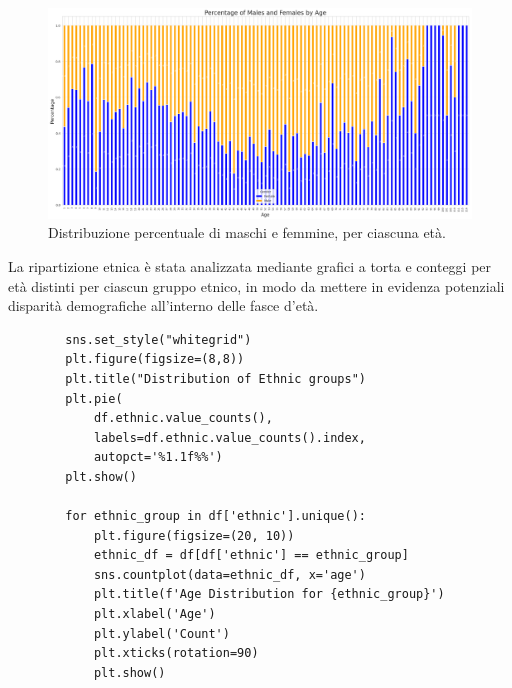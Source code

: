 \documentclass[a4paper,12pt]{report}
\begin{document}
	\begin{figure}[H]
		\centering
		\includegraphics[width=1.0\textwidth]{img/gender_byage_images.png}
		\caption{Distribuzione percentuale di maschi e femmine, per ciascuna età.}
	\end{figure} 
	
	La ripartizione etnica è stata analizzata mediante grafici a torta e conteggi per età distinti per ciascun gruppo etnico, in modo da mettere in evidenza potenziali disparità demografiche all'interno delle fasce d'età. \\
	
	\begin{verbatim}
		sns.set_style("whitegrid")
		plt.figure(figsize=(8,8))
		plt.title("Distribution of Ethnic groups")
		plt.pie(
			df.ethnic.value_counts(), 
			labels=df.ethnic.value_counts().index, 
			autopct='%1.1f%%')
		plt.show()
		
		for ethnic_group in df['ethnic'].unique():
			plt.figure(figsize=(20, 10))
			ethnic_df = df[df['ethnic'] == ethnic_group]
			sns.countplot(data=ethnic_df, x='age')
			plt.title(f'Age Distribution for {ethnic_group}')
			plt.xlabel('Age')
			plt.ylabel('Count')
			plt.xticks(rotation=90)
			plt.show()
	\end{verbatim}
	
\end{document}
